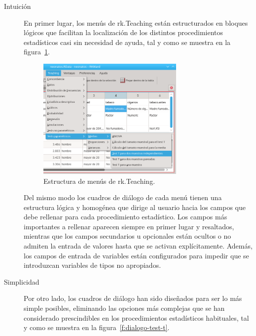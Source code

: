 \documentclass[a4paper,10pt,twoside]{article}
\newcommand{\rkteaching}{\textsf{rk.Teaching}}
\begin{document}
\begin{description}
\item[Intuición] En primer lugar, los menús de \rkteaching{} están estructurados en bloques lógicos que facilitan la
localización de los distintos procedimientos estadísticos casi sin necesidad de ayuda, tal y como se muestra en la
figura~\ref{f:menu-test-t}.

\begin{figure}[htbp!]
\centering
\includegraphics[width=0.7\textwidth]{img/menu_test_t.png}
\caption{Estructura de menús de \rkteaching.}
\label{f:menu-test-t}
\end{figure}

Del mismo modo los cuadros de diálogo de cada menú tienen una estructura lógica y homogénea que dirige al usuario hacia
los campos que debe rellenar para cada procedimiento estadístico. 
Los campos más importantes a rellenar aparecen siempre en primer lugar y resaltados, mientras que los campos secundarios
u opcionales están ocultos o no admiten la entrada de valores hasta que se activan explícitamente. 
Además, los campos de entrada de variables están configurados para impedir que se introduzcan variables de tipos no
apropiados. 

\item[Simplicidad] Por otro lado, los cuadros de diálogo han sido diseñados para ser lo más simple posibles,
eliminando las opciones más complejas que se han considerado prescindibles en los procedimientos estadísticos
habituales, tal y como se muestra en la figura~\ref{f:dialogo-test-t}.


\end{description}
\end{document}
